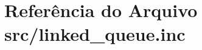 \hypertarget{linked__queue_8inc}{}\section{Referência do Arquivo src/linked\+\_\+queue.inc}
\label{linked__queue_8inc}
